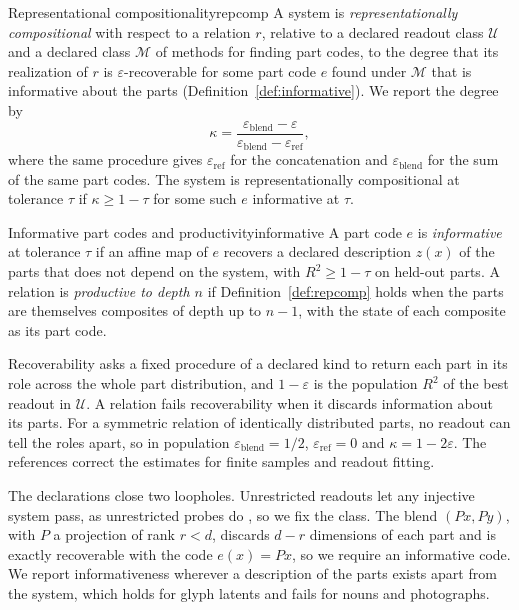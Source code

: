 \documentclass[10pt]{article}
\theoremstyle{plain}
\theoremstyle{remark}
\newcommand{\U}{\mathcal{U}}
\newcommand{\M}{\mathcal{M}}
\begin{document}
\begin{defbox}{Representational compositionality}{repcomp}
A system is \emph{representationally compositional} with respect to a relation $r$, relative to a declared readout class $\U$ and a declared class $\M$ of methods for finding part codes, to the degree that its realization of $r$ is $\varepsilon$-recoverable for some part code $e$ found under $\M$ that is informative about the parts (Definition~\ref{def:informative}). We report the degree by
\begin{equation}
  \kappa = \frac{\varepsilon_{\mathrm{blend}} - \varepsilon}{\varepsilon_{\mathrm{blend}} - \varepsilon_{\mathrm{ref}}},
  \label{eq:kappa}
\end{equation}
where the same procedure gives $\varepsilon_{\mathrm{ref}}$ for the concatenation and $\varepsilon_{\mathrm{blend}}$ for the sum of the same part codes. The system is representationally compositional at tolerance $\tau$ if $\kappa \ge 1 - \tau$ for some such $e$ informative at $\tau$.
\end{defbox}

\begin{defbox}{Informative part codes and productivity}{informative}
A part code $e$ is \emph{informative} at tolerance $\tau$ if an affine map of $e$ recovers a declared description $z(x)$ of the parts that does not depend on the system, with $R^2 \ge 1 - \tau$ on held-out parts. A relation is \emph{productive to depth $n$} if Definition~\ref{def:repcomp} holds when the parts are themselves composites of depth up to $n - 1$, with the state of each composite as its part code.
\end{defbox}

Recoverability asks a fixed procedure of a declared kind to return each part in its role across the whole part distribution, and $1 - \varepsilon$ is the population $R^2$ of the best readout in $\U$. A relation fails recoverability when it discards information about its parts. For a symmetric relation of identically distributed parts, no readout can tell the roles apart, so in population $\varepsilon_{\mathrm{blend}} = 1/2$, $\varepsilon_{\mathrm{ref}} = 0$ and $\kappa = 1 - 2\varepsilon$. The references correct the estimates for finite samples and readout fitting.

The declarations close two loopholes. Unrestricted readouts let any injective system pass, as unrestricted probes do \citep{hewitt2019}, so we fix the class. The blend $(Px, Py)$, with $P$ a projection of rank $r < d$, discards $d - r$ dimensions of each part and is exactly recoverable with the code $e(x) = Px$, so we require an informative code. We report informativeness wherever a description of the parts exists apart from the system, which holds for glyph latents and fails for nouns and photographs.
\end{document}
